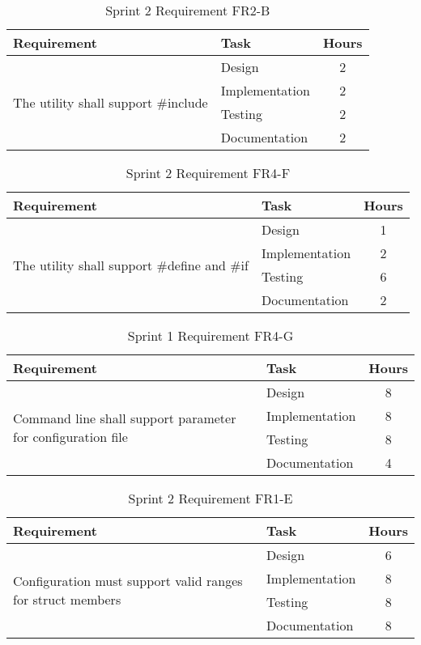 \begin{table}[!ht] \small \center
\caption{Sprint 2 Requirement FR2-B\label{tab:sp2_req2b}}
\begin{tabular}{l l c}
	\toprule
	Requirement & Task & Hours \\
	\midrule
	\multirow{4}{5cm}{The utility shall support \#include} & Design & 2 \\
	& Implementation & 2 \\
	& Testing & 2 \\
	& Documentation & 2 \\
	\bottomrule
\end{tabular}
\end{table}

\begin{table}[!ht] \small \center
\caption{Sprint 2 Requirement FR4-F\label{tab:sp2_req4f}}
\begin{tabular}{l l c}
	\toprule
	Requirement & Task & Hours \\
	\midrule
	\multirow{4}{5cm}{The utility shall support \#define and \#if} & Design & 1 \\
	& Implementation & 2 \\
	& Testing & 6 \\
	& Documentation & 2 \\
	\bottomrule
\end{tabular}
\end{table}

\begin{table}[!ht] \small \center
\caption{Sprint 1 Requirement FR4-G\label{tab:sp2_req4g}}
\begin{tabular}{l l c}
	\toprule
	Requirement & Task & Hours \\
	\midrule
	\multirow{4}{5cm}{Command line shall support parameter for configuration file} & Design & 8 \\
	& Implementation & 8 \\
	& Testing & 8 \\
	& Documentation & 4 \\
	\bottomrule
\end{tabular}
\end{table}

\begin{table}[!ht] \small \center
\caption{Sprint 2 Requirement FR1-E\label{tab:sp2_req1e}}
\begin{tabular}{l l c}
	\toprule
	Requirement & Task & Hours \\
	\midrule
	\multirow{4}{5cm}{Configuration must support valid ranges for struct members} & Design & 6 \\
	& Implementation & 8 \\
	& Testing & 8 \\
	& Documentation & 8 \\
	\bottomrule
\end{tabular}
\end{table}

